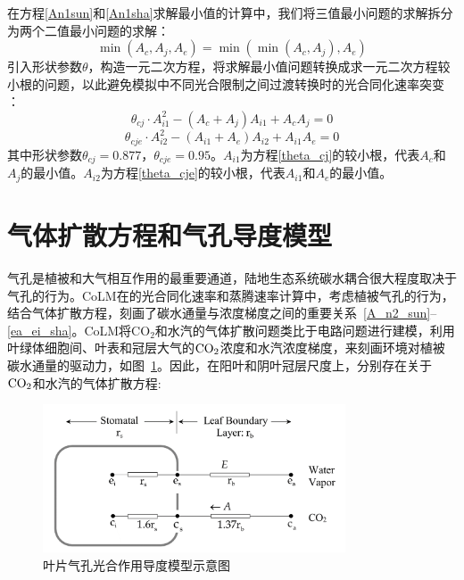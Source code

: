 在方程\eqref{An1sun}和\eqref{An1sha}求解最小值的计算中，我们将三值最小问题的求解拆分为两个二值最小问题的求解：
\begin{equation}\label{min_Ac_Aj_Ae}
\min \left(A_{c}, A_{j}, A_{e}\right)=\min \left(\min \left(A_{c}, A_{j}\right), A_{e}\right)
\end{equation}
引入形状参数$\theta$，构造一元二次方程，将求解最小值问题转换成求一元二次方程较小根的问题，以此避免模拟中不同光合限制之间过渡转换时的光合同化速率突变 \citep{collatz1991,collatz1992}：
\begin{equation}\label{theta_cj}
\theta_{c j} \cdot A_{i1}^{2}-\left(A_{c}+A_{j}\right) A_{i1}+A_{c} A_{j}=0
\end{equation}
\begin{equation}\label{theta_cje}
\theta_{c j e} \cdot A_{i2}^{2}-\left(A_{i1}+A_{e}\right) A_{i2}+A_{i1} A_{e}=0
\end{equation}
其中形状参数$\theta_{cj}=0.877$，$\theta_{cje}=0.95$。$A_{i1}$为方程\eqref{theta_cj}的较小根，代表$A_c$和$A_j$的最小值。$A_{i2}$为方程\eqref{theta_cje}的较小根，代表$A_{i1}$和$A_e$的最小值。


\section{气体扩散方程和气孔导度模型}\label{气体扩散方程和气孔导度模型}
气孔是植被和大气相互作用的最重要通道，陆地生态系统碳水耦合很大程度取决于气孔的行为。CoLM在的光合同化速率和蒸腾速率计算中，考虑植被气孔的行为，结合气体扩散方程，刻画了碳水通量与浓度梯度之间的重要关系~\eqref{A_n2_sun}--\eqref{ea_ei_sha}。CoLM将CO$_2$和水汽的气体扩散问题类比于电路问题进行建模，利用叶绿体细胞间、叶表和冠层大气的$\rm CO_2$浓度和水汽浓度梯度，来刻画环境对植被碳水通量的驱动力，如图~\ref{fig:叶片气孔光合作用导度模型示意图}。因此，在阳叶和阴叶冠层尺度上，分别存在关于$\rm CO_2$和水汽的气体扩散方程:

{
\begin{figure}[htbp]
\centering
\includegraphics[width=0.8\textwidth]{Figures/气孔导度和光合作用/叶片气孔光合作用导度模型示意图.png}
\caption{叶片气孔光合作用导度模型示意图}
\label{fig:叶片气孔光合作用导度模型示意图}
\end{figure}
}

